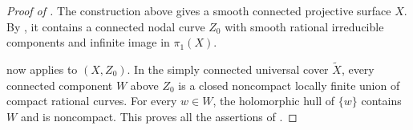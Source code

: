 \begin{proof}[Proof of ]
The construction above gives a smooth connected projective surface
$X$.  By ,
it contains a connected nodal curve $Z_0$ with smooth rational
irreducible components and infinite image in $\pi_1(X)$.

 now applies to $(X,Z_0)$.  In the simply
connected universal cover $\widetilde X$, every connected component
$W$ above $Z_0$ is a closed noncompact locally finite union of
compact rational curves.  For every $w\in W$, the holomorphic
hull of $\{w\}$ contains $W$ and is noncompact.  This proves all
the assertions of .
\end{proof}

